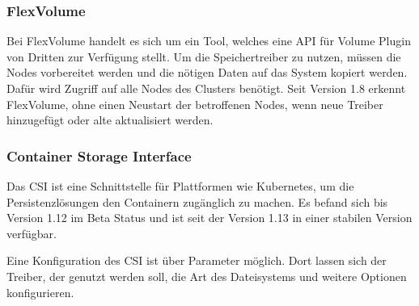 \subsubsection{FlexVolume}
Bei FlexVolume handelt es sich um ein Tool, welches eine API für Volume Plugin von Dritten zur Verfügung stellt. Um die Speichertreiber zu nutzen, müssen die Nodes vorbereitet werden und die nötigen Daten auf das System kopiert werden. Dafür wird Zugriff auf alle Nodes des Clusters benötigt. Seit Version 1.8 erkennt FlexVolume, ohne einen Neustart der betroffenen Nodes, wenn neue Treiber hinzugefügt oder alte aktualisiert werden.

\subsubsection{Container Storage Interface}
Das \ac{CSI} ist eine Schnittstelle für Plattformen wie Kubernetes, um die Persistenzlösungen den Containern zugänglich zu machen. Es befand sich bis Version 1.12 im Beta Status und ist seit der Version 1.13 in einer stabilen Version verfügbar. \medskip

Eine Konfiguration des \ac{CSI} ist über Parameter möglich. Dort lassen sich der Treiber, der genutzt werden soll, die Art des Dateisystems und weitere Optionen konfigurieren.
